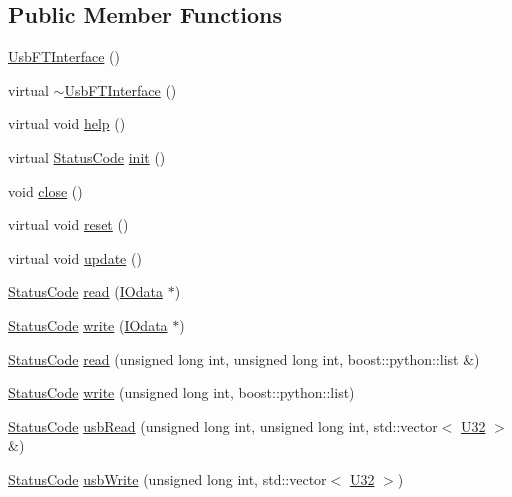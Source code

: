 \subsection*{Public Member Functions}
\begin{DoxyCompactItemize}
\item 
\hyperlink{classUsbFTInterface_aa0f871007821694c3e1f53f65cea8af4}{UsbFTInterface} ()
\item 
virtual \hyperlink{classUsbFTInterface_ad1fb563d0ff5f76aa833d02e65d4204a}{$\sim$UsbFTInterface} ()
\item 
virtual void \hyperlink{classUsbFTInterface_a91a0046390c76ca8abaa330fa244279c}{help} ()
\item 
virtual \hyperlink{classStatusCode}{StatusCode} \hyperlink{classUsbFTInterface_a5371fe7b447850599eaec81a0ffa2ba0}{init} ()
\item 
void \hyperlink{classUsbFTInterface_ad555e20eb4b80da1d3cac5a8c6509bb5}{close} ()
\item 
virtual void \hyperlink{classUsbFTInterface_a7bd95c22da69daeaad7f752f560740f4}{reset} ()
\item 
virtual void \hyperlink{classUsbFTInterface_a6adc58a50696c9b3268e84c291901ce7}{update} ()
\item 
\hyperlink{classStatusCode}{StatusCode} \hyperlink{classUsbFTInterface_ab9daafce1d7878b95ba0655a570922e2}{read} (\hyperlink{classIOdata}{IOdata} $\ast$)
\item 
\hyperlink{classStatusCode}{StatusCode} \hyperlink{classUsbFTInterface_a059296c0d7e5118f975f1dfa2e1f3fbb}{write} (\hyperlink{classIOdata}{IOdata} $\ast$)
\item 
\hyperlink{classStatusCode}{StatusCode} \hyperlink{classUsbFTInterface_a682e63cb6168be314aa3cc6e6a10ec59}{read} (unsigned long int, unsigned long int, boost::python::list \&)
\item 
\hyperlink{classStatusCode}{StatusCode} \hyperlink{classUsbFTInterface_a2efbde3a31cdbe44a3cbd66da6592870}{write} (unsigned long int, boost::python::list)
\item 
\hyperlink{classStatusCode}{StatusCode} \hyperlink{classUsbFTInterface_adb38dfafa3946dd373585e596851b6e6}{usbRead} (unsigned long int, unsigned long int, std::vector$<$ \hyperlink{classUsbFTInterface_aee2201fe4d977aa03568fa8dbacc39ba}{U32} $>$ \&)
\item 
\hyperlink{classStatusCode}{StatusCode} \hyperlink{classUsbFTInterface_ab7bf021f1fa3af385234e639c84827ef}{usbWrite} (unsigned long int, std::vector$<$ \hyperlink{classUsbFTInterface_aee2201fe4d977aa03568fa8dbacc39ba}{U32} $>$)

\end{DoxyCompactItemize}
